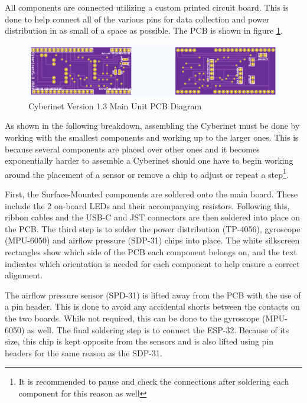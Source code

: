 All components are connected utilizing a custom printed circuit board. This is done to help connect all of the various pins for data collection and power distribution in as small of a space as possible. The PCB is shown in figure \ref{fig:mainUnitPCB}.

\begin{center}
    \begin{figure}
        \centering
        \includegraphics[scale=0.6]{diagrams/PCBs/cyberinetPCB.png}
        \caption{Cyberinet Version 1.3  Main Unit PCB Diagram}
        \label{fig:mainUnitPCB}
    \end{figure}
\end{center}

As shown in the following breakdown, assembling the Cyberinet must be done by working with the smallest components and working up to the larger ones. This is because several components are placed over other ones and it becomes exponentially harder to assemble a Cyberinet should one have to begin working around the placement of a sensor or remove a chip to adjust or repeat a step\footnote{It is recommended to pause and check the connections after soldering each component for this reason as well}.

First, the Surface-Mounted components are soldered onto the main board. These include the 2 on-board LEDs and their accompanying resistors. Following this, ribbon cables and the USB-C and JST connectors are then soldered into place on the PCB. The third step is to solder the power distribution (TP-4056), gyroscope (MPU-6050) and airflow pressure (SDP-31) chips into place. The white silkscreen rectangles show which side of the PCB each component belongs on, and the text indicates which orientation is needed for each component to help ensure a correct alignment.

The airflow pressure sensor (SPD-31) is lifted away from the PCB with the use of a pin header. This is done to avoid any accidental shorts between the contacts on the two boards. While not required, this can be done to the gyroscope (MPU-6050) as well. The final soldering step is to connect the ESP-32. Because of its size, this chip is kept opposite from the sensors and is also lifted using pin headers for the same reason as the SDP-31.

